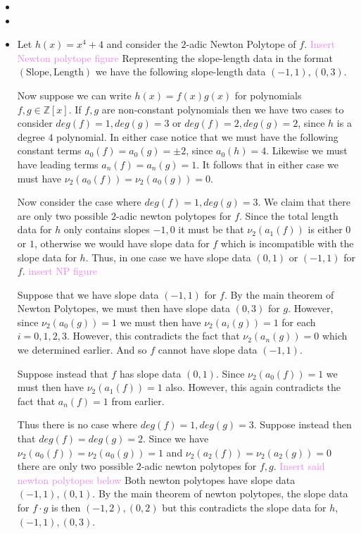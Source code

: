\documentclass[12pt,letterpaper,boxed]{hmcpset}
\newcommand{\wg}[1]{\textcolor{violet}{#1}}
\newcommand{\Z}{\mathbb Z}
\begin{document}
\begin{solution}
\begin{itemize}
\item 
\item
\item Let $h(x) = x^4 + 4$ and consider the $2$-adic Newton Polytope
of $f$. 
\wg{Insert Newton polytope figure}
Representing the slope-length data in the format $(\text{Slope},
\text{Length})$ we have the following slope-length data $(-1, 1),
(0,3)$. 

Now suppose we can write $h(x) = f(x)g(x)$ for polynomials $f,g \in
\Z[x]$. If $f,g$ are non-constant polynomials then we have two cases
to consider $deg(f) = 1, deg(g) = 3$ or $deg(f) = 2, deg(g) = 2$,
since $h$ is a degree $4$ polynomial. In either case notice that we
must have the following constant terms $a_0(f) = a_0(g) = \pm 2$,
since $a_0(h) = 4$. Likewise we must have leading terms $a_n(f) =
a_n(g) = 1$. It follows that in either case we must have $\nu_2(a_0(f)) =
\nu_2(a_0(g)) = 0$. 

Now consider the case where $deg(f) = 1, deg(g) = 3$.
We claim that there are only two possible $2$-adic newton polytopes
for $f$. Since the total length data for $h$ only contains slopes
$-1,0$ it must be that $\nu_2(a_1(f))$ is either $0$ or $1$, otherwise
we would have slope data for $f$ which is incompatible with the slope
data for $h$.
Thus, in one case we have slope data $(0,1)$ or $(-1,1)$ for $f$. 
\wg{insert NP figure}

Suppose that we have slope data $(-1,1)$ for $f$. 
By the main theorem of Newton Polytopes, we must then have slope
data $(0,3)$ for $g$. However, since $\nu_2(a_0(g)) = 1$ we must then
have $\nu_2(a_i(g)) = 1$ for each $i=0,1,2,3$. However, this
contradicts the fact that $\nu_2(a_n(g)) = 0$ which we determined
earlier. And so $f$ cannot have slope data $(-1,1)$.

Suppose instead that $f$ has slope data $(0,1)$. Since $\nu_2(a_0(f))
= 1$ we must then have $\nu_2(a_1(f)) = 1$ also. However, this again
contradicts the fact that $a_n(f) = 1$ from earlier.

Thus there is no case where $deg(f) = 1, deg(g) = 3$. Suppose instead
then that $deg(f) = deg(g) = 2$. Since we have $\nu_2(a_0(f)) =
\nu_2(a_0(g)) = 1$ and $\nu_2(a_2(f)) = \nu_2(a_2(g)) = 0$ there are
only two possible $2$-adic newton polytopes for $f,g$.
\wg{Insert said newton polytopes below}
Both newton polytopes have slope data $(-1,1),(0,1)$. By the main
theorem of newton polytopes, the slope data for $f\cdot g$ is then 
$(-1, 2), (0,2)$ but this contradicts the slope data for $h$, $(-1,1),
(0,3)$.


\end{itemize}
\end{solution}
\end{document}
